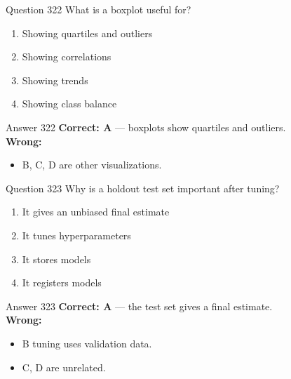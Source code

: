 \documentclass[aspectratio=169,11pt]{beamer}
\begin{document}
	\begin{frame}{Question 322}
		What is a boxplot useful for?
		\begin{enumerate}[label=\Alph*.]
			\item Showing quartiles and outliers
			\item Showing correlations
			\item Showing trends
			\item Showing class balance
		\end{enumerate}
	\end{frame}
	\begin{frame}{Answer 322}
		\textbf{Correct: A} --- boxplots show quartiles and outliers.\\
		\vspace{0.5em}
		\textbf{Wrong:}
		\begin{itemize}
			\item B, C, D are other visualizations.
		\end{itemize}
	\end{frame}
	
	\begin{frame}{Question 323}
		Why is a holdout test set important after tuning?
		\begin{enumerate}[label=\Alph*.]
			\item It gives an unbiased final estimate
			\item It tunes hyperparameters
			\item It stores models
			\item It registers models
		\end{enumerate}
	\end{frame}
	\begin{frame}{Answer 323}
		\textbf{Correct: A} --- the test set gives a final estimate.\\
		\vspace{0.5em}
		\textbf{Wrong:}
		\begin{itemize}
			\item B tuning uses validation data.
			\item C, D are unrelated.
		\end{itemize}
	\end{frame}
	
\end{document}
